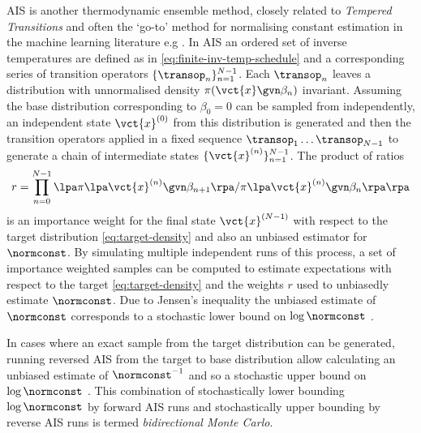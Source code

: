 \ac{AIS} \citep{neal2001annealed} is another thermodynamic ensemble method, closely related to \emph{Tempered Transitions} \citep{neal1996sampling} and often the `go-to' method for normalising constant estimation in the machine learning literature e.g \citep{salakhutdinov2008quantitative,wu2016quantitative}. In \ac{AIS} an ordered set of inverse temperatures are defined as in \eqref{eq:finite-inv-temp-schedule} and a corresponding series of transition operators $\lbrace \transop_n \rbrace_{n=1}^{N-1}$. Each $\transop_n$ leaves a distribution with unnormalised density $\pi(\vct{x}\gvn\beta_n)$ invariant. Assuming the base distribution corresponding to $\beta_0 = 0$ can be sampled from independently, an independent state $\vct{x}^{(0)}$ from this distribution is generated and then the transition operators applied in a fixed sequence $\transop_{1} \dots \transop_{N-1}$ to generate a chain of intermediate states $\lbrace \vct{x}^{(n)} \rbrace_{n=1}^{N-1}$. The product of ratios
\begin{equation}\label{eq:ais-weights}
  r = \prod_{n=0}^{N-1} \lpa \pi\lpa\vct{x}^{(n)}\gvn\beta_{n+1}\rpa / \pi\lpa\vct{x}^{(n)}\gvn\beta_n\rpa \rpa
\end{equation}
is an importance weight for the final state $\vct{x}^{(N-1)}$ with respect to the target distribution \eqref{eq:target-density} and also an unbiased estimator for $\normconst$. By simulating multiple independent runs of this process, a set of importance weighted samples can be computed to estimate expectations with respect to the target \eqref{eq:target-density} and the weights $r$ used to unbiasedly estimate $\normconst$. Due to Jensen's inequality the unbiased estimate of $\normconst$ corresponds to a stochastic lower bound on $\log \normconst$ \citep{grosse2015sandwiching}.

In cases where an exact sample from the target distribution can be generated, running reversed \ac{AIS} from the target to base distribution allow calculating an unbiased estimate of $\normconst^{-1}$ and so a stochastic upper bound on $\log \normconst$ \citep{grosse2015sandwiching}. This combination of stochastically lower bounding $\log \normconst$ by forward \ac{AIS} runs and stochastically upper bounding by reverse \ac{AIS} runs is termed \emph{bidirectional Monte Carlo}.


